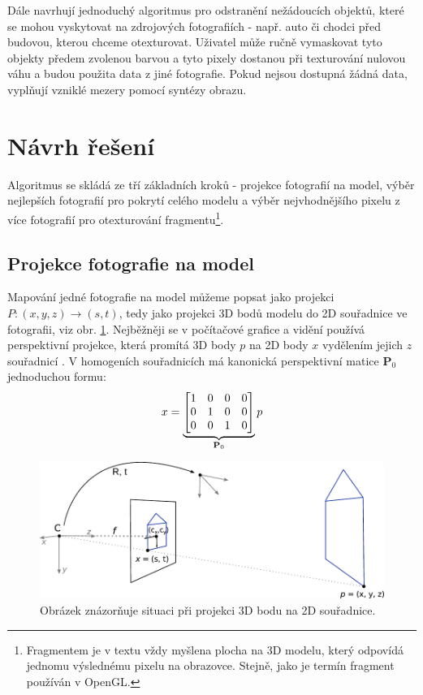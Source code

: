 \documentclass[11pt,twoside,a4paper]{book}
\begin{document}
Dále navrhují jednoduchý algoritmus pro odstranění nežádoucích objektů, které se mohou vyskytovat na zdrojových fotografiích - např. auto či chodci před budovou, kterou chceme otexturovat. Uživatel může ručně vymaskovat tyto objekty předem zvolenou barvou a tyto pixely dostanou při texturování nulovou váhu a budou použita data z jiné fotografie. Pokud nejsou dostupná žádná data, vyplňují vzniklé mezery pomocí syntézy obrazu.

\section{Návrh řešení}

Algoritmus se skládá ze tří základních kroků - projekce fotografií na model, výběr nejlepších fotografií pro pokrytí celého modelu a výběr nejvhodnějšího pixelu z více fotografií pro otexturování fragmentu\footnote{Fragmentem je v textu vždy myšlena plocha na 3D modelu, který odpovídá jednomu výslednému pixelu na obrazovce. Stejně, jako je termín fragment používán v OpenGL.}.

\subsection{Projekce fotografie na model}
\label{sec:matice-kamery}

Mapování jedné fotografie na model můžeme popsat jako projekci $P: (x, y, z) \to (s, t)$, tedy jako projekci 3D bodů modelu do 2D souřadnice ve fotografii, viz obr. \ref{fig:camera-projection}. Nejběžněji se v počítačové grafice a vidění používá perspektivní projekce, která promítá 3D body $p$ na 2D body $x$ vydělením jejich $z$ souřadnicí \cite{Szeliski}. V homogeních souřadnicích má kanonická perspektivní matice \textbf{P}$_0$ jednoduchou formu:
\begin{align}
\label{eq:persp-projection}
x = 
\underbrace{
\begin{bmatrix}
1 & 0 & 0 & 0 \\
0 & 1 & 0 & 0 \\
0 & 0 & 1 & 0 \\
\end{bmatrix}}_\text{\textbf{P}$_0$}
p
\end{align}
\noindent

\begin{figure}[t]
\begin{center}
\includegraphics[width=\textwidth]{figures/camera-projection}
\caption{Obrázek znázorňuje situaci při projekci 3D bodu na 2D souřadnice.}
\label{fig:camera-projection}
\end{center}
\end{figure}
\end{document}
